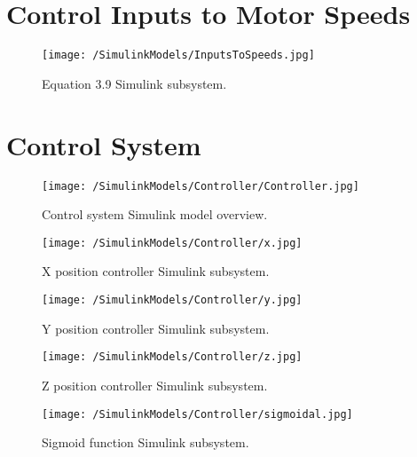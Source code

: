 \FloatBarrier
\clearpage
\section{Control Inputs to Motor Speeds}

\begin{figure}[htb]
\begin{center}
	\texttt{[image: /SimulinkModels/InputsToSpeeds.jpg]}%
	\end{center}
	\caption{Equation 3.9 Simulink subsystem.}%
\end{figure}
\FloatBarrier
\clearpage

\section{Control System}

\begin{figure}[htb]
\begin{center}
	\texttt{[image: /SimulinkModels/Controller/Controller.jpg]}%
	\end{center}
	\caption{Control system Simulink model overview.}%
\end{figure}

\begin{figure}[htb]
\begin{center}
	\texttt{[image: /SimulinkModels/Controller/x.jpg]}%
	\end{center}
	\caption{X position controller Simulink subsystem.}%
\end{figure}

\begin{figure}[htb]
\begin{center}
	\texttt{[image: /SimulinkModels/Controller/y.jpg]}%
	\end{center}
	\caption{Y position controller Simulink subsystem.}%
\end{figure}

\begin{figure}[htb]
\begin{center}
	\texttt{[image: /SimulinkModels/Controller/z.jpg]}%
	\end{center}
	\caption{Z position controller Simulink subsystem.}%
\end{figure}

\begin{figure}[htb]
\begin{center}
	\texttt{[image: /SimulinkModels/Controller/sigmoidal.jpg]}%
	\end{center}
	\caption{Sigmoid function Simulink subsystem.}%
\end{figure}

